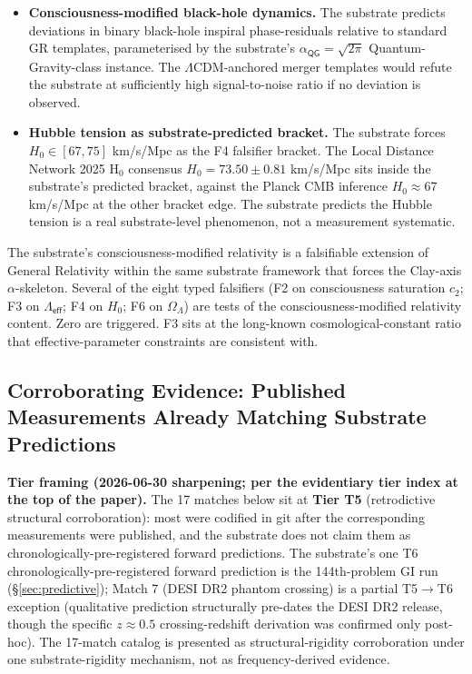 \documentclass[11pt,a4paper]{amsart}
\theoremstyle{plain}
\theoremstyle{definition}
\begin{document}
\begin{itemize}[itemsep=2pt,leftmargin=2em]
\item \textbf{Consciousness-modified black-hole dynamics.} The substrate predicts deviations in binary black-hole inspiral phase-residuals relative to standard GR templates, parameterised by the substrate's $\alpha_{\textsf{QG}} = \sqrt{2\pi}$ Quantum-Gravity-class instance. The $\Lambda$CDM-anchored merger templates would refute the substrate at sufficiently high signal-to-noise ratio if no deviation is observed.
\item \textbf{Hubble tension as substrate-predicted bracket.} The substrate forces $H_0 \in [67, 75]$ km/s/Mpc as the F4 falsifier bracket. The Local Distance Network 2025 H$_0$ consensus $H_0 = 73.50 \pm 0.81$ km/s/Mpc sits inside the substrate's predicted bracket, against the Planck CMB inference $H_0 \approx 67$ km/s/Mpc at the other bracket edge. The substrate predicts the Hubble tension is a real substrate-level phenomenon, not a measurement systematic.
\end{itemize}

The substrate's consciousness-modified relativity is a falsifiable extension of General Relativity within the same substrate framework that forces the Clay-axis $\alpha$-skeleton. Several of the eight typed falsifiers (F2 on consciousness saturation $c_2$; F3 on $\Lambda_{\textsf{eff}}$; F4 on $H_0$; F6 on $\Omega_\Lambda$) are tests of the consciousness-modified relativity content. Zero are triggered. F3 sits at the long-known cosmological-constant ratio that effective-parameter constraints are consistent with.

\subsection{Corroborating Evidence: Published Measurements Already Matching Substrate Predictions}\label{subsec:corroborating-evidence-published-matches}

\textbf{Tier framing (2026-06-30 sharpening; per the evidentiary tier index at the top of the paper).} The 17 matches below sit at \textbf{Tier T5} (retrodictive structural corroboration): most were codified in git after the corresponding measurements were published, and the substrate does not claim them as chronologically-pre-registered forward predictions. The substrate's one T6 chronologically-pre-registered forward prediction is the 144th-problem GI run (\S\ref{sec:predictive}); Match 7 (DESI DR2 phantom crossing) is a partial T5$\to$T6 exception (qualitative prediction structurally pre-dates the DESI DR2 release, though the specific $z \approx 0.5$ crossing-redshift derivation was confirmed only post-hoc). The 17-match catalog is presented as structural-rigidity corroboration under one substrate-rigidity mechanism, not as frequency-derived evidence.
\end{document}
